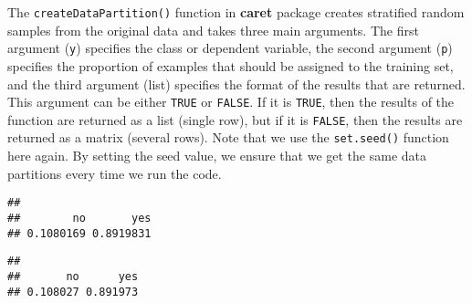 \documentclass[
]{book}
\newenvironment{Shaded}{\begin{snugshade}}{\end{snugshade}}
\newcommand{\AttributeTok}[1]{\textcolor[rgb]{0.77,0.63,0.00}{#1}}
\newcommand{\CommentTok}[1]{\textcolor[rgb]{0.56,0.35,0.01}{\textit{#1}}}
\newcommand{\ConstantTok}[1]{\textcolor[rgb]{0.00,0.00,0.00}{#1}}
\newcommand{\DecValTok}[1]{\textcolor[rgb]{0.00,0.00,0.81}{#1}}
\newcommand{\FloatTok}[1]{\textcolor[rgb]{0.00,0.00,0.81}{#1}}
\newcommand{\FunctionTok}[1]{\textcolor[rgb]{0.00,0.00,0.00}{#1}}
\newcommand{\NormalTok}[1]{#1}
\newcommand{\OtherTok}[1]{\textcolor[rgb]{0.56,0.35,0.01}{#1}}
\newcommand{\SpecialCharTok}[1]{\textcolor[rgb]{0.00,0.00,0.00}{#1}}
\begin{document}
The \texttt{createDataPartition()} function in \textbf{caret} package creates stratified random samples from the original data and takes three main arguments. The first argument (\texttt{y}) specifies the class or dependent variable, the second argument (\texttt{p}) specifies the proportion of examples that should be assigned to the training set, and the third argument (list) specifies the format of the results that are returned. This argument can be either \texttt{TRUE} or \texttt{FALSE}. If it is \texttt{TRUE}, then the results of the function are returned as a list (single row), but if it is \texttt{FALSE}, then the results are returned as a matrix (several rows). Note that we use the \texttt{set.seed()} function here again. By setting the seed value, we ensure that we get the same data partitions every time we run the code.

\begin{Shaded}
\end{Shaded}

\begin{verbatim}
## 
##        no       yes 
## 0.1080169 0.8919831
\end{verbatim}

\begin{Shaded}
\end{Shaded}

\begin{verbatim}
## 
##       no      yes 
## 0.108027 0.891973
\end{verbatim}
\end{document}
